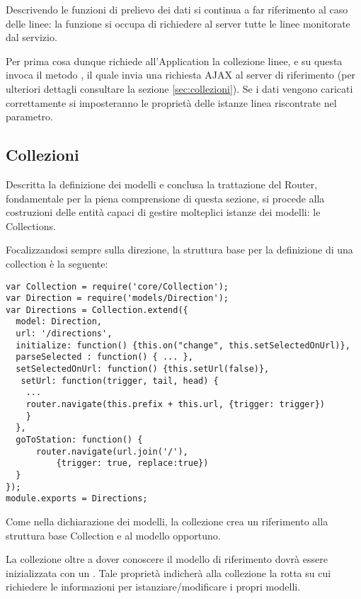 Descrivendo le funzioni di prelievo dei dati si continua a far riferimento al caso delle linee: la funzione  si occupa di richiedere al server tutte le linee monitorate dal servizio.

Per prima cosa dunque richiede all'Application la collezione linee, e su questa invoca il metodo , il quale invia una richiesta AJAX al server di riferimento (per ulteriori dettagli consultare la sezione \ref{sec:collezioni}). Se i dati vengono caricati correttamente si imposteranno le proprietà  delle istanze linea riscontrate nel parametro.

\subsection{Collezioni} %
\label{sub:collezioni}

Descritta la definizione dei modelli e conclusa la trattazione del Router, fondamentale per la piena comprensione di questa sezione, si procede alla costruzioni delle entità capaci di gestire molteplici istanze dei modelli: le Collections.

Focalizzandosi sempre sulla direzione, la struttura base per la definizione di una collection è la seguente:
{\footnotesize
\begin{verbatim}
var Collection = require('core/Collection');
var Direction = require('models/Direction');
var Directions = Collection.extend({
  model: Direction,
  url: '/directions',
  initialize: function() {this.on("change", this.setSelectedOnUrl)},
  parseSelected : function() { ... },    
  setSelectedOnUrl: function() {this.setUrl(false)},
   setUrl: function(trigger, tail, head) {
    ...
    router.navigate(this.prefix + this.url, {trigger: trigger})
    }   
  },
  goToStation: function() {
      router.navigate(url.join('/'), 
          {trigger: true, replace:true})
  }
});
module.exports = Directions;
\end{verbatim}
}
\newpage
Come nella dichiarazione dei modelli, la collezione crea un riferimento alla struttura base Collection e al modello opportuno.

La collezione oltre a dover conoscere il modello di riferimento dovrà essere inizializzata con un . Tale proprietà indicherà alla collezione la rotta su cui richiedere le informazioni per istanziare/modificare i propri modelli.

